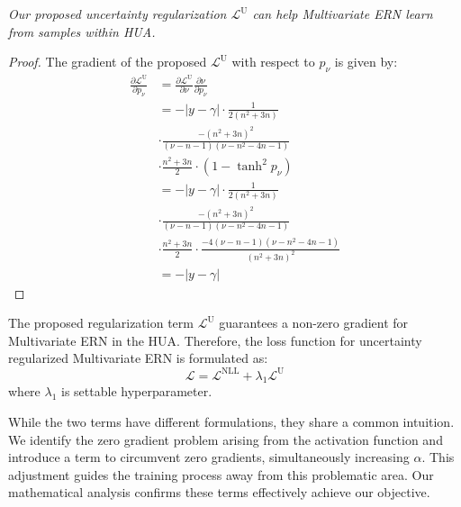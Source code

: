\begin{theorem}
\textit{Our proposed uncertainty regularization $\mathcal{L}^{\mathrm{U}}$ can help Multivariate ERN learn from samples within HUA.}
\end{theorem}

\begin{proof}
The gradient of the proposed $\mathcal{L}^{\mathrm{U}}$ with respect to $p_{\nu}$ is given by:
\begin{equation}
\begin{aligned}
\frac{\partial \mathcal{L}^{\mathrm{U}}}{\partial p_{\nu}} &= \frac{\partial \mathcal{L}^{\mathrm{U}}}{\partial \nu} \frac{\partial \nu}{\partial p_{\nu}}     \\
&=-| y-\gamma | \cdot \frac{1}{2(n^2+3n)} \\
&\cdot \frac{-(n^2 + 3n)^2}{(\nu-n-1)(\nu-n^2-4n-1)} \\
&\cdot \frac{n^2+3n}{2} \cdot (1-\tanh^2 p_{\nu}) \\
&=-| y-\gamma | \cdot  \frac{1}{2(n^2+3n)} \\
&\cdot \frac{-(n^2 + 3n)^2}{(\nu-n-1)(\nu-n^2-4n-1)}\\
&\cdot \frac{n^2+3n}{2} \cdot \frac{-4(\nu-n-1)(\nu-n^2-4n-1)}{(n^2 + 3n)^2} \\
&=-| y-\gamma | 
\end{aligned}
\end{equation}

\end{proof}

The proposed regularization term $\mathcal{L}^{\mathrm{U}}$ guarantees a non-zero gradient for Multivariate ERN in the HUA. Therefore, the loss function for uncertainty regularized Multivariate ERN is formulated as:
\begin{equation}
    \mathcal{L}=\mathcal{L}^{\mathrm{NLL}}+\lambda_1 \mathcal{L}^{\mathrm{U}}
\end{equation}
where $\lambda_1$ is settable hyperparameter.

While the two terms have different formulations, they share a common intuition. We identify the zero gradient problem arising from the activation function and introduce a term to circumvent zero gradients, simultaneously increasing $\alpha$.
This adjustment guides the training process away from this problematic area.
Our mathematical analysis confirms these terms effectively achieve our objective.

